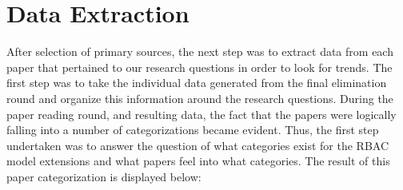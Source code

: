 \section{Data Extraction} \label{sec:extraction}

After selection of primary sources, the next step was to extract data from each paper that pertained to our research questions in order to look for trends.  The first step was to take the individual data generated from the final elimination round and organize this information around the research questions.  During the paper reading round, and resulting data, the fact that the papers were logically falling into a number of categorizations became evident.  Thus, the first step undertaken was to answer the question of what categories exist for the RBAC model extensions and what papers feel into what categories.  The result of this paper categorization is displayed below:

